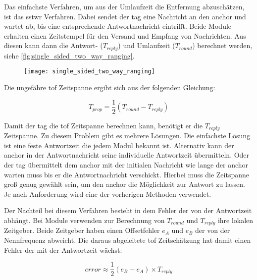 Das einfachste Verfahren, um aus der Umlaufzeit die Entfernung abzuschätzen, ist das \Gls{sstwr} Verfahren. Dabei sendet der \Gls{tag} eine Nachricht an den \Gls{anchor} und wartet ab, bis eine entsprechende Antwortnachricht eintrifft. Beide Module erhalten einen Zeitstempel für den Versand und Empfang von Nachrichten. Aus diesen kann dann die Antwort- ($T_{reply}$) und Umlaufzeit ($T_{round}$) berechnet werden, siehe \autoref{fig:single_sided_two_way_ranging}. \cite{decawave2015twr, decawave2016dw1kusermanual}

\begin{figure}
	\centering
	\texttt{[image: single\_sided\_two\_way\_ranging]}
	\label{fig:single_sided_two_way_ranging}
\end{figure}

Die ungefähre \Gls{tof} Zeitspanne ergibt sich aus der folgenden Gleichung:

\begin{equation}
T_{prop}=\frac{1}{2}\left(T_{round}-T_{reply}\right)
\end{equation}

Damit der \Gls{tag} die \Gls{tof} Zeitspanne berechnen kann, benötigt er die $T_{reply}$ Zeitspanne. Zu diesem Problem gibt es mehrere Lösungen. Die einfachste Lösung ist eine feste Antwortzeit die jedem Modul bekannt ist. Alternativ kann der \Gls{anchor} in der Antwortnachricht seine individuelle Antwortzeit übermitteln. Oder der \Gls{tag} übermittelt dem \Gls{anchor} mit der initialen Nachricht wie lange der \Gls{anchor} warten muss bis er die Antwortnachricht verschickt. Hierbei muss die Zeitspanne groß genug gewählt sein, um den \Gls{anchor} die Möglichkeit zur Antwort zu lassen. Je nach Anforderung wird eine der vorherigen Methoden verwendet.

Der Nachteil bei diesem Verfahren besteht in dem Fehler der von der Antwortzeit abhängt. Bei Module verwenden zur Berechnung von $T_{round}$ und $T_{reply}$ ihre lokalen Zeitgeber. Beide Zeitgeber haben einen Offsetfehler $e_{A}$ und $e_{B}$ der von der Nennfrequenz abweicht. Die daraus abgeleitete \Gls{tof} Zeitschätzung hat damit einen Fehler der mit der Antwortzeit wächst:

\begin{equation}
error\approx\frac{1}{2}\left(e_B-e_A\right)\times T_{reply}
\end{equation}


